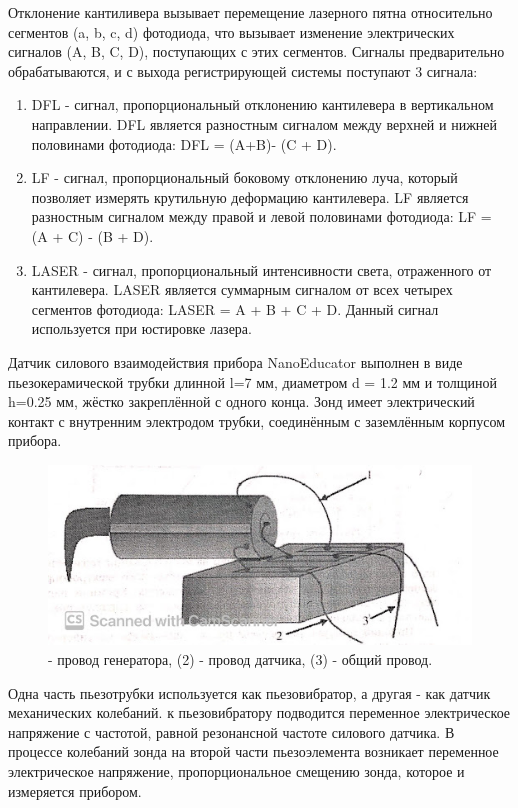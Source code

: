 \documentclass[a4paper,12pt]{article}
\theoremstyle{plain} %
\theoremstyle{definition} %
\theoremstyle{remark} %
\begin{document}
Отклонение кантиливера вызывает перемещение лазерного пятна относительно сегментов (a, b, c, d) фотодиода, что вызывает изменение электрических сигналов (A, B, C, D), поступающих с этих сегментов. Сигналы предварительно обрабатываются, и с выхода регистрирующей системы поступают 3 сигнала:
\begin{enumerate}
	\item
	DFL - сигнал, пропорциональный отклонению кантилевера в вертикальном направлении. DFL является разностным сигналом между верхней и нижней половинами фотодиода: DFL = (A+B)- (C + D). 
	\item
	LF - сигнал, пропорциональный боковому отклонению луча, который позволяет измерять крутильную деформацию кантилевера. LF является разностным сигналом между правой и левой половинами фотодиода: LF = (A + C) - (B + D). 
	\item
	LASER - сигнал, пропорциональный интенсивности света, отраженного от кантилевера. LASER является суммарным сигналом от всех четырех сегментов фотодиода: LASER = A + B + C + D. Данный сигнал используется при юстировке лазера. 
\end{enumerate}
Датчик силового взаимодействия прибора NanoEducator выполнен в виде пьезокерамической трубки длинной l=7 мм, диаметром d = 1.2 мм и толщиной h=0.25 мм, жёстко закреплённой с одного конца. Зонд имеет электрический контакт с внутренним электродом трубки, соединённым с заземлённым корпусом прибора.
\begin{figure}[H]
	\centering
	\includegraphics[scale=0.6]{pic6.jpg}
	\caption{- провод генератора, (2) - провод датчика, (3) - общий провод.}
	\label{pic6}
\end{figure}
Одна часть пьезотрубки используется как пьезовибратор, а другая - как датчик механических колебаний. к пьезовибратору подводится переменное электрическое напряжение с частотой, равной резонансной частоте силового датчика. В процессе колебаний зонда на второй части пьезоэлемента возникает переменное электрическое напряжение, пропорциональное смещению зонда, которое и измеряется прибором.
\end{document}

